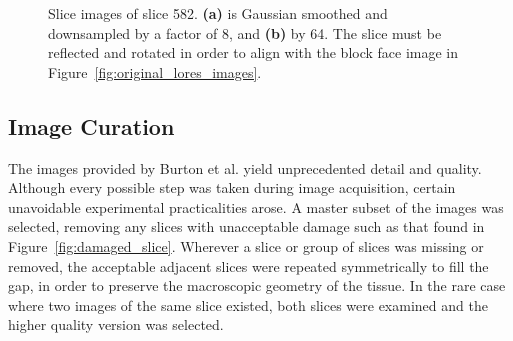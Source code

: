     \begin{figure}[htbp]
      \centering
      \caption{Slice images of slice 582. \textbf{(a)} is Gaussian smoothed and downsampled by a factor of 8, and \textbf{(b)} by 64. The slice must be reflected and rotated in order to align with the block face image in Figure~\ref{fig:original_lores_images}.}
      \label{fig:original_hires_images}
    \end{figure}
	

  \subsection{Image Curation} %
  \label{sub:image_curation}
    The images provided by Burton et al. yield unprecedented detail and quality. Although every possible step was taken during image acquisition, certain unavoidable experimental practicalities arose. A master subset of the images was selected, removing any slices with unacceptable damage such as that found in Figure~\ref{fig:damaged_slice}. Wherever a slice or group of slices was missing or removed, the acceptable adjacent slices were repeated symmetrically to fill the gap, in order to preserve the macroscopic geometry of the tissue. In the rare case where two images of the same slice existed, both slices were examined and the higher quality version was selected.
    

